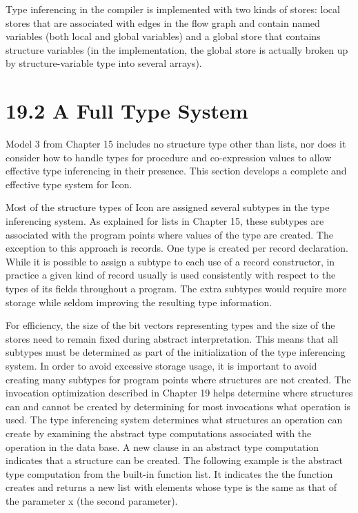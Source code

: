 Type inferencing in the compiler is implemented with two kinds of
stores: local stores that are associated with edges in the flow graph
and contain named variables (both local and global variables) and a
global store that contains structure variables (in the implementation,
the global store is actually broken up by structure-variable type into
several arrays).


\section[19.2 A Full Type System]{19.2 A Full Type System}

Model 3 from Chapter 15 includes no structure type other than lists,
nor does it consider how to handle types for procedure and
co-expression values to allow effective type inferencing in their
presence. This section develops a complete and effective type system
for Icon.

Most of the structure types of Icon are assigned several subtypes in
the type inferencing system. As explained for lists in Chapter 15,
these subtypes are associated with the program points where values of
the type are created. The exception to this approach is records. One
type is created per record declaration. While it is possible to assign
a subtype to each use of a record constructor, in practice a given
kind of record usually is used consistently with respect to the types
of its fields throughout a program. The extra subtypes would require
more storage while seldom improving the resulting type information.

For efficiency, the size of the bit vectors representing types and the
size of the stores need to remain fixed during abstract
interpretation. This means that all subtypes must be determined as
part of the initialization of the type inferencing system. In order to
avoid excessive storage usage, it is important to avoid creating many
subtypes for program points where structures are not created. The
invocation optimization described in Chapter 19 helps determine where
structures can and cannot be created by determining for most
invocations what operation is used. The type inferencing system
determines what structures an operation can create by examining the
abstract type computations associated with the operation in the data
base. A new clause in an abstract type computation indicates that a
structure can be created. The following example is the abstract type
computation from the built-in function list. It indicates the the
function creates and returns a new list with elements whose type is
the same as that of the parameter x (the second parameter).

